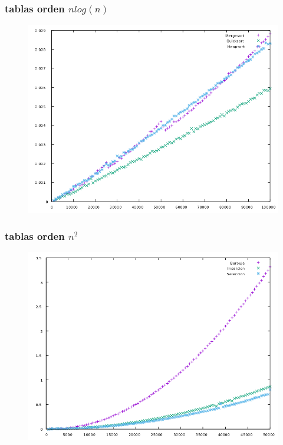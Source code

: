 \documentclass[compress]{beamer}
\begin{document}
\begin{frame}
\frametitle{tablas orden $nlog(n)$}
	\begin{figure}
  \centering
    \includegraphics[width=1\textwidth]{nlogn.png}
  \label{fig:ejemplo}
\end{figure}
\end{frame}
\begin{frame}
\frametitle{tablas orden $n^2$}
	\begin{figure}
  \centering
    \includegraphics[width=1\textwidth]{Eficiencian2.png}
  \label{fig:ejemplo}
\end{figure}
\end{frame}
\end{document}

